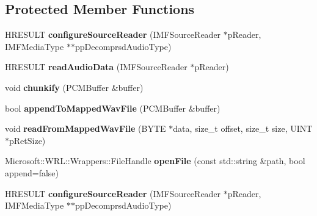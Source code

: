 \subsection*{Protected Member Functions}
\begin{DoxyCompactItemize}
\item 
\mbox{\label{classexperimental_1_1MP3Reader_a54f29729b30ab954c27260dd8e47aa80}} 
H\+R\+E\+S\+U\+LT {\bfseries configure\+Source\+Reader} (I\+M\+F\+Source\+Reader $\ast$p\+Reader, I\+M\+F\+Media\+Type $\ast$$\ast$pp\+Decomprsd\+Audio\+Type)
\item 
\mbox{\label{classexperimental_1_1MP3Reader_a683444b2f139ef213a650d6185e4ecd2}} 
H\+R\+E\+S\+U\+LT {\bfseries read\+Audio\+Data} (I\+M\+F\+Source\+Reader $\ast$p\+Reader)
\item 
\mbox{\label{classexperimental_1_1MP3Reader_aaf15fe12119f655e402f073bcab6ba57}} 
void {\bfseries chunkify} (P\+C\+M\+Buffer \&buffer)
\item 
\mbox{\label{classexperimental_1_1MP3Reader_ab4b2bdd353b1682c79e51fc176e5a452}} 
bool {\bfseries append\+To\+Mapped\+Wav\+File} (P\+C\+M\+Buffer \&buffer)
\item 
\mbox{\label{classexperimental_1_1MP3Reader_a1c9ff42605a93181d0ec6f0acd6cf57d}} 
void {\bfseries read\+From\+Mapped\+Wav\+File} (B\+Y\+TE $\ast$data, size\+\_\+t offset, size\+\_\+t size, U\+I\+NT $\ast$p\+Ret\+Size)
\item 
\mbox{\label{classexperimental_1_1MP3Reader_a1cadd20bd601cffc8874328a733b1408}} 
Microsoft\+::\+W\+R\+L\+::\+Wrappers\+::\+File\+Handle {\bfseries open\+File} (const std\+::string \&path, bool append=false)
\item 
\mbox{\label{classexperimental_1_1MP3Reader_ac4fbaaf49c6a8cba64cd2dc535dda9f0}} 
H\+R\+E\+S\+U\+LT {\bfseries configure\+Source\+Reader} (I\+M\+F\+Source\+Reader $\ast$p\+Reader, I\+M\+F\+Media\+Type $\ast$$\ast$pp\+Decomprsd\+Audio\+Type)
\item 
\mbox{\label{classexperimental_1_1MP3Reader_ab10cd6c2508fbc39fdfd36afe5fdb340}} 

\end{DoxyCompactItemize}
